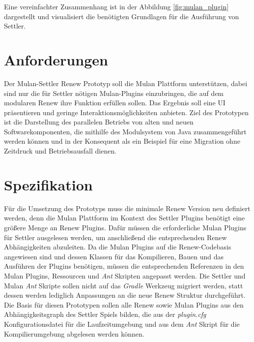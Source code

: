 	Eine vereinfachter Zusammenhang ist in der Abbildung \ref{fig:mulan_plugin} dargestellt und visualisiert die benötigten Grundlagen für die Ausführung von Settler.


\section{Anforderungen} \label{sec:anforderungen2}
	Der Mulan-Settler Renew Prototyp soll die Mulan Plattform unterstützen, dabei sind nur die für Settler nötigen Mulan-Plugins einzubringen, die auf dem modularen Renew ihre Funktion erfüllen sollen. Das Ergebnis soll eine UI präsentieren und geringe Interaktionsmöglichkeiten anbieten. \newline 
	Ziel des Prototypen ist die Darstellung des parallelen Betriebs von alten und neuen Softwarekomponenten, die mithilfe des Modulsystem von Java zusammengeführt werden können und in der Konsequent als ein Beispiel für eine Migration ohne  Zeitdruck und Betriebsausfall dienen.

\section{Spezifikation}
	Für die Umsetzung des Prototyps muss die minimale Renew Version neu definiert werden, denn die Mulan Plattform im Kontext des Settler Plugins benötigt eine größere Menge an Renew Plugins. Dafür müssen die erforderliche Mulan Plugins für Settler ausgelesen werden, um anschließend die entsprechenden Renew Abhängigkeiten abzuleiten. \newline
	Da die Mulan Plugins auf die Renew-Codebasis angewiesen sind und dessen Klassen für das Kompilieren, Bauen und das Ausführen der Plugins benötigen, müssen die entsprechenden Referenzen in den Mulan Plugins, Ressourcen und \textit{Ant} Skripten angepasst werden. \newline
	Die Settler und Mulan \textit{Ant} Skripte sollen nicht auf das \textit{Gradle} Werkzeug migriert werden, statt dessen werden lediglich Anpassungen an die neue Renew Struktur durchgeführt. \bigbreak
	Die Basis für diesen Prototypen sollen alle Renew sowie Mulan Plugins aus den Abhängigkeitsgraph des Settler Spiels bilden, die aus der \textit{plugin.cfg} Konfigurationsdatei für die Laufzeitumgebung und aus dem \textit{Ant} Skript für die Kompilierumgebung abgelesen werden können. 


